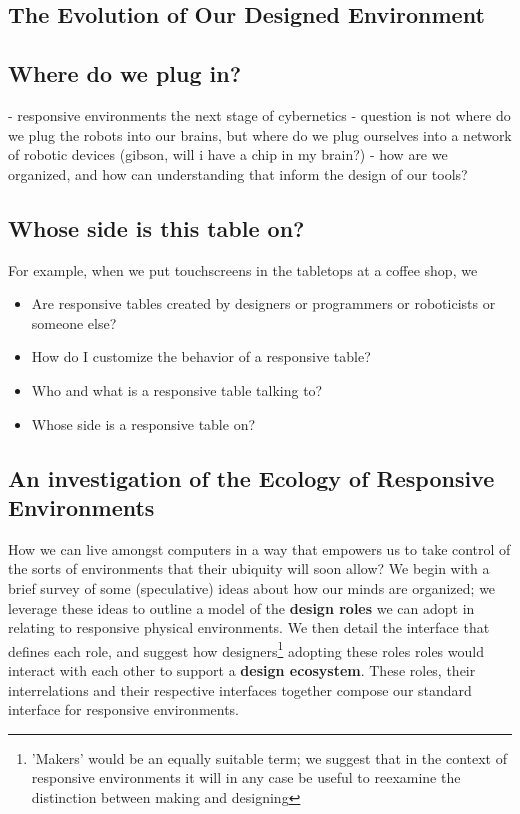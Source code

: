 \subsection{The Evolution of Our Designed Environment}
%

\subsection{Where do we plug in?}
%
- responsive environments the next stage of cybernetics
- question is not where do we plug the robots into our brains, but where do we plug ourselves into a network of robotic devices (gibson, will i have a chip in my brain?)
- how are we organized, and how can understanding that inform the design of our tools?

\subsection{Whose side is this table on?}
%


For example, when we put touchscreens in the tabletops at a coffee shop, we 
\begin{itemize}
\item Are responsive tables created by designers or programmers or roboticists or someone else?
\item How do I customize the behavior of a responsive table?
\item Who and what is a responsive table talking to?
\item Whose side is a responsive table on?
\end{itemize}

\subsection{An investigation of the Ecology of Responsive Environments}
%
How we can live amongst computers in a way that empowers us to take control of the sorts of environments that their ubiquity will soon allow?  
We begin with a brief survey of some (speculative) ideas about how our minds are organized; we leverage these ideas to outline a model of the {\bf design roles} we can adopt in relating to responsive physical environments.
We then detail the interface that defines each role, and suggest how designers\footnote{'Makers' would be an equally suitable term; we suggest that in the context of responsive environments it will in any case be useful to reexamine the distinction between making and designing} adopting these roles roles would interact with each other to support a {\bf design ecosystem}.
These roles, their interrelations and their respective interfaces together compose our standard interface for responsive environments.


